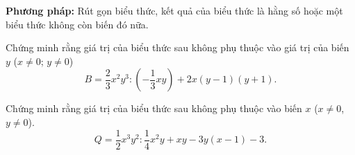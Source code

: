 \begin{dang}
	\textbf{Phương pháp:} Rút gọn biểu thức, kết quả của biểu thức là hằng số hoặc một biểu thức không còn biến đó nữa.
\end{dang}
\begin{vd}
	Chứng minh rằng giá trị của biểu thức sau không phụ thuộc vào giá trị của biến $y$ ($x\ne0$; $y\ne 0$)
	\[
	B=\dfrac{2}{3}x^2y^3:\left(-\dfrac{1}{3}xy\right)+2x(y-1)(y+1).
	\]
\end{vd}
\begin{vd}
	Chứng minh rằng giá trị của biểu thức sau không  phụ thuộc vào biến $x$ ($x\ne 0$, $y\ne 0$).
	\[
	Q=\dfrac{1}{2}x^3y^2:\dfrac{1}{4}x^2y+xy-3y(x-1)-3.
	\]
\end{vd}

